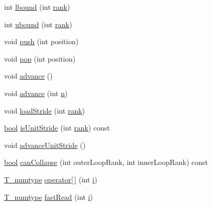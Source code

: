 \begin{DoxyCompactItemize}
int \hyperlink{class__bz__ArrayExprBinaryOp_a49617b32b06cb47a78e32f48deda616a}{lbound} (int \hyperlink{class__bz__ArrayExprBinaryOp_a21b807f5de687f033836d8a82bae7f10}{rank})
\item 
int \hyperlink{class__bz__ArrayExprBinaryOp_a5dd03ea5b8cea9acd13d9b7a5f8e2b03}{ubound} (int \hyperlink{class__bz__ArrayExprBinaryOp_a21b807f5de687f033836d8a82bae7f10}{rank})
\item 
void \hyperlink{class__bz__ArrayExprBinaryOp_ab0f74cf687846504772dfbf8f57afa11}{push} (int position)
\item 
void \hyperlink{class__bz__ArrayExprBinaryOp_adc42a9025eb836beb8a955fbaa7b2d7a}{pop} (int position)
\item 
void \hyperlink{class__bz__ArrayExprBinaryOp_a26622e7de65512f50ad80f0ba7a05449}{advance} ()
\item 
void \hyperlink{class__bz__ArrayExprBinaryOp_a39aa3ff1d99a38eff892d2276455d322}{advance} (int \hyperlink{indexexpr_8h_ab427e2e2b4d6cec55fa088ea2a692ace}{n})
\item 
void \hyperlink{class__bz__ArrayExprBinaryOp_a01485c8e8bb735f6f775ece68dd48704}{load\+Stride} (int \hyperlink{class__bz__ArrayExprBinaryOp_a21b807f5de687f033836d8a82bae7f10}{rank})
\item 
\hyperlink{compiler_8h_abb452686968e48b67397da5f97445f5b}{bool} \hyperlink{class__bz__ArrayExprBinaryOp_ab973f4c7f269b4caa807e586b3246d2c}{is\+Unit\+Stride} (int \hyperlink{class__bz__ArrayExprBinaryOp_a21b807f5de687f033836d8a82bae7f10}{rank}) const 
\item 
void \hyperlink{class__bz__ArrayExprBinaryOp_aa9f3d6f7391f3d4afbee07fbe0633bd5}{advance\+Unit\+Stride} ()
\item 
\hyperlink{compiler_8h_abb452686968e48b67397da5f97445f5b}{bool} \hyperlink{class__bz__ArrayExprBinaryOp_a24926a348acb368f10524ed03469fe1d}{can\+Collapse} (int outer\+Loop\+Rank, int inner\+Loop\+Rank) const 
\item 
\hyperlink{class__bz__ArrayExprBinaryOp_a7e6a612fc4afccbeaa3a2fdd32f8850e}{T\+\_\+numtype} \hyperlink{class__bz__ArrayExprBinaryOp_aca6e5d6f740c2892cadf5e2f72ff566c}{operator\mbox{[}$\,$\mbox{]}} (int \hyperlink{indexexpr_8h_aabd77643995707c185e95c8cb2782c81}{i})
\item 
\hyperlink{class__bz__ArrayExprBinaryOp_a7e6a612fc4afccbeaa3a2fdd32f8850e}{T\+\_\+numtype} \hyperlink{class__bz__ArrayExprBinaryOp_a300305c1ca1e5aa92c694228346ee0d5}{fast\+Read} (int \hyperlink{indexexpr_8h_aabd77643995707c185e95c8cb2782c81}{i})
\item 

\end{DoxyCompactItemize}
